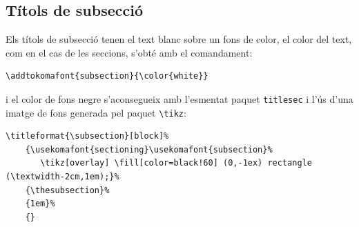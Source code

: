 \documentclass[a4paper,
                             twoside,
                             BCOR1.0cm,
                             DIV11,
                             parskip=full,
                             11pt]{scrbook}
\begin{document}
\subsection{Títols de subsecció}\label{sbsec:titsubsec}
Els títols de subsecció tenen el text blanc sobre un fons de color, el color del text, com en el cas de les seccions,  s'obté amb el comandament:
\begin{scriptsize}
\begin{verbatim}
\addtokomafont{subsection}{\color{white}}
\end{verbatim}
\end{scriptsize}
i el color de fons negre s'aconsegueix amb l'esmentat paquet \verb+titlesec+ i l'ús d'una imatge de fons generada pel paquet \verb+\tikz+:
\begin{tiny}
\begin{verbatim}
\titleformat{\subsection}[block]%              
    {\usekomafont{sectioning}\usekomafont{subsection}% 
       \tikz[overlay] \fill[color=black!60] (0,-1ex) rectangle (\textwidth-2cm,1em);}%  
    {\thesubsection}%                   
    {1em}%
    {}
\end{verbatim}
\end{tiny}

\end{document}
